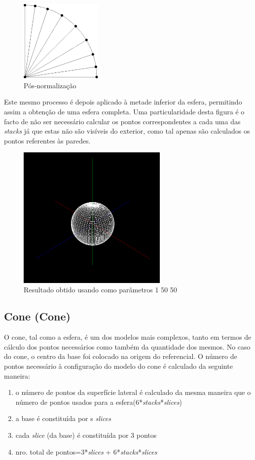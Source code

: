 \documentclass{article}
\begin{document}
\begin{figure}[H]
    \centering
    \includegraphics[height=4cm]{afterNorm.png}
    \caption{Pós-normalização}
\end{figure}

Este mesmo processo é depois aplicado à metade inferior da esfera, permitindo assim a obtenção de uma esfera completa. Uma particularidade desta figura é o facto de não ser necessário calcular os pontos correspondentes a cada uma das \textit{stacks} já que estas não são visíveis do exterior, como tal apenas são calculados os pontos referentes às paredes.

\begin{figure}[H]
    \centering
    \includegraphics[height=7cm]{sphereFinal.png}
    \caption{Resultado obtido usando como parâmetros 1 50 50}
\end{figure}

\subsection{Cone (Cone)}
O cone, tal como a esfera, é um dos modelos mais complexos, tanto em termos de cálculo dos pontos necessários como também da quantidade dos mesmos. No caso do cone, o centro da base foi colocado na origem do referencial. O número de pontos necessário à configuração do modelo do cone é calculado da seguinte maneira:
\begin{enumerate}
    \item o número de pontos da superfície lateral é calculado da mesma maneira que o número de pontos usados para a esfera(6*\textit{stacks}*\textit{slices})
    \item a base é constituída por s \textit{slices}
    \item cada \textit{slice} (da base) é constituída por 3 pontos
    \item nro. total de pontos=3*\textit{slices} + 6*\textit{stacks}*\textit{slices}
\end{enumerate}
\end{document}
